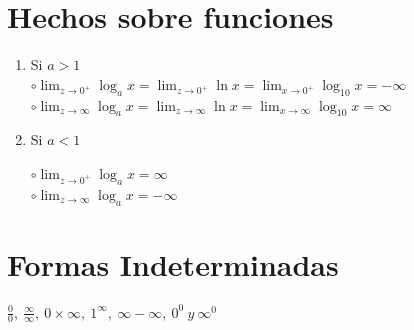 \documentclass[12pt,a4paper]{article}
\begin{document}
    \section{\textcolor{violeta}{Hechos sobre funciones}}
    \begin{tcolorbox}[colback=white!5!white,colframe=violeta!75!black]
        \begin{enumerate}
            \centering
            \item Si $a>1 $\\ \vspace{0.5cm}
            $\circ\displaystyle\lim_{z\to{0^+}}{\log_ax}=\displaystyle\lim_{z\to{0^+}}{\ln{x}}=\displaystyle\lim_{x\to{0^+}}{\log_{10}{x}}=-\infty$\\ \vspace{0.4cm}
            $\circ\displaystyle\lim_{z\to{\infty}}{\log_ax}=\displaystyle\lim_{z\to{\infty}}{\ln{x}}=\displaystyle\lim_{x\to{\infty}}{\log_{10}{x}}=\infty$
            \item Si $a<1 $\\ \vspace{0.1cm}
            \begin{multicols}{2}
                $\circ\displaystyle\lim_{z\to{0^+}}{\log_a{x}}=\infty$\\
                $\circ\displaystyle\lim_{z\to{\infty}}{\log_a{x}}=-\infty$
            \end{multicols}
        \end{enumerate}        
    \end{tcolorbox}

    \pagebreak

    \section{\textcolor{violeta}{Formas Indeterminadas}}
    \begin{tcolorbox}[colback=white!5!white,colframe=violeta!75!black]
        \centering
        $\frac{0}{0},\:\frac{\infty}{\infty},\:0\times\infty,\:1^{\infty},\:\infty-\infty,\:0^0\:y\:\infty^0 $
    \end{tcolorbox}
\end{document}
